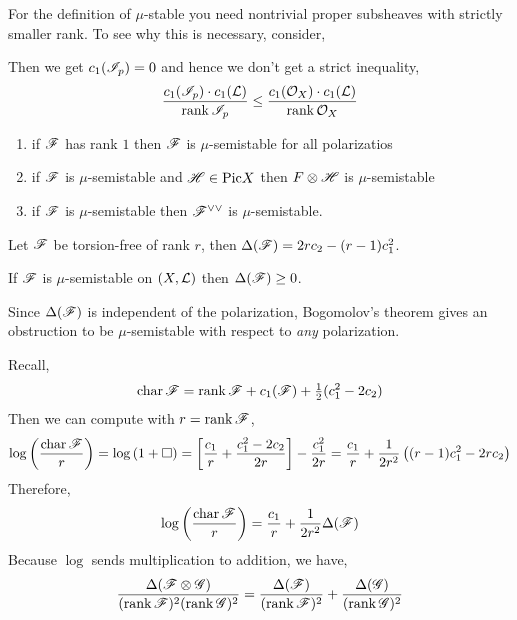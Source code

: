 \documentclass[12pt]{article}
\begin{document}
\begin{rmk}
For the definition of $\mu$-stable you need nontrivial proper subsheaves with strictly smaller rank. To see why this is necessary, consider,
\begin{center}
\end{center}
Then we get $c_1(\mathscr{I}_p) = 0$ and hence we don't get a strict inequality,
\[ \frac{c_1(\mathscr{I}_p) \cdot c_1(\mathcal{L})}{\operatorname{\mathrm{rank}}{\mathscr{I}_p}} \le \frac{c_1(\mathcal{O}_{X}) \cdot c_1(\mathcal{L})}{\operatorname{\mathrm{rank}}{\mathcal{O}_{X}}} \]
\end{rmk}

\begin{example}
\begin{enumerate}
\item if $\mathscr{F}$ has rank $1$ then $\mathscr{F}$ is $\mu$-semistable for all polarizatios
\item if $\mathscr{F}$ is $\mu$-semistable and $\mathscr{H} \in \mathrm{Pic}{X}$ then $F \otimes \mathscr{H}$ is $\mu$-semistable
\item if $\mathscr{F}$ is $\mu$-semistable then $\mathscr{F}^{\vee \vee}$ is $\mu$-semistable. 
\end{enumerate}
\end{example}

\begin{defn}
Let $\mathscr{F}$ be torsion-free of rank $r$, then $\Delta(\mathscr{F}) = 2r c_2 - (r-1) c_1^2$.
\end{defn}

\begin{theorem}[Bogomolov]
If $\mathscr{F}$ is $\mu$-semistable on $(X, \mathcal{L})$ then $\Delta(\mathscr{F}) \ge 0$.
\end{theorem}

\begin{rmk}
Since $\Delta(\mathscr{F})$ is independent of the polarization, Bogomolov's theorem gives an obstruction to be $\mu$-semistable with respect to \textit{any} polarization.
\end{rmk}

\begin{prop}
Recall,
\[ \operatorname{\mathrm{char}}{\mathscr{F}} = \operatorname{\mathrm{rank}}{\mathscr{F}} + c_1(\mathscr{F}) + \tfrac{1}{2}(c_1^2 - 2 c_2) \]
Then we can compute with $r = \operatorname{\mathrm{rank}}{\mathscr{F}}$,
\[ \log{ \left( \frac{\operatorname{\mathrm{char}}{\mathscr{F}}}{r} \right)} = \log{(1 + \square)} = \left[ \frac{c_1}{r} + \frac{c_1^2 - 2 c_2}{2r} \right] - \frac{c_1^2}{2 r} = \frac{c_1}{r} + \frac{1}{2 r^2} \left( (r-1) c_1^2 - 2 r c_2 \right) \]
Therefore,
\[ \log{ \left( \frac{\operatorname{\mathrm{char}}{\mathscr{F}}}{r} \right)} = \frac{c_1}{r} + \frac{1}{2 r^2} \Delta(\mathscr{F}) \]
Because $\log$ sends multiplication to addition, we have,
\[ \frac{\Delta(\mathscr{F} \otimes \mathscr{G})}{(\operatorname{\mathrm{rank}}{\mathscr{F}})^2 (\operatorname{\mathrm{rank}}{\mathscr{G}})^2} = \frac{\Delta(\mathscr{F})}{(\operatorname{\mathrm{rank}}{\mathscr{F}})^2} + \frac{\Delta(\mathscr{G})}{(\operatorname{\mathrm{rank}}{\mathscr{G}})^2} \]
\end{prop}
\end{document}
